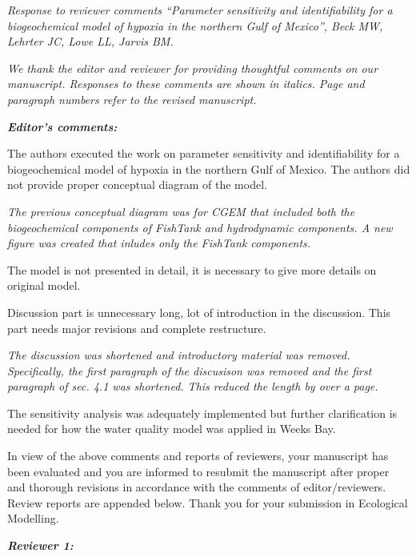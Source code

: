 \documentclass[letterpaper,12pt]{article}\usepackage[]{graphicx}\usepackage[]{color}
\newcommand{\Bigtxt}[1]{\textbf{\textit{#1}}}
\begin{document}
\raggedright


{\it Response to reviewer comments ``Parameter sensitivity and identifiability for a biogeochemical model of hypoxia in the northern Gulf of Mexico'', Beck MW, Lehrter JC, Lowe LL, Jarvis BM.}

{\it We thank the editor and reviewer for providing thoughtful comments on our manuscript.  Responses to these comments are shown in italics.  Page and paragraph numbers refer to the revised manuscript.}

\Bigtxt{Editor's comments:}

The authors executed the work on parameter sensitivity and identifiability for a biogeochemical model of hypoxia in the northern Gulf of Mexico. The authors did not provide proper conceptual diagram of the model.  

{\it The previous conceptual diagram was for CGEM that included both the biogeochemical components of FishTank and hydrodynamic components.  A new figure was created that inludes only the FishTank components.  }

The model is not presented in detail, it is necessary to give more details on original model. 

{\it }

Discussion part is unnecessary long, lot of introduction in the discussion. This part needs major revisions and complete restructure. 

{\it The discussion was shortened and introductory material was removed.  Specifically, the first paragraph of the discusison was removed and the first paragraph of sec. 4.1 was shortened.  This reduced the length by over a page.}

The sensitivity analysis was adequately implemented but further clarification is needed for how the water quality model was applied in Weeks Bay. 

{\it }

In view of the above comments and reports of reviewers, your manuscript has been evaluated and you are informed to resubmit the manuscript after proper and thorough revisions in accordance with the comments of editor/reviewers. Review reports are appended below. Thank you for your submission in Ecological Modelling. 

\Bigtxt{Reviewer 1:}
\end{document}
